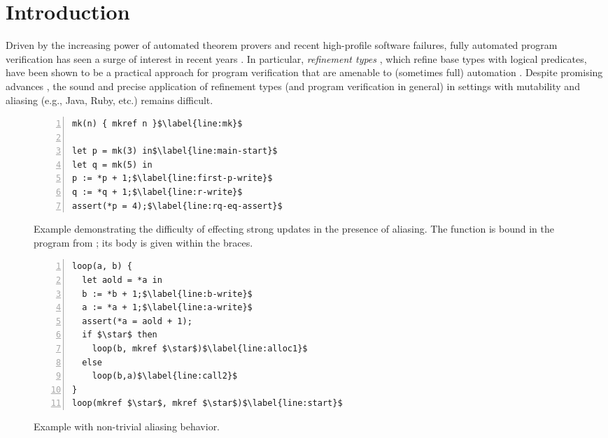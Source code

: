 \section{Introduction}
\label{sec:intro}
Driven by the increasing power of automated theorem provers and
recent high-profile software failures,
fully automated program verification has seen a surge of interest
in recent years \cite{leino2010dafny,cousot2005astree,ball2011decade,zave2012using,hawblitzel2015ironfleet,bhargavan2017everest}.
In particular, \emph{refinement types}
\cite{flanagan2006hybrid,xi1999dependent,freeman1991refinement,bengtson2011refinement},
which refine base types with logical predicates, have been shown to be a practical
approach for program verification that are amenable to
(sometimes full) automation \cite{rondon2008liquid,vazou2014refinement,vazou2013abstract,unno2009dependent}.
Despite promising advances \cite{rondon2010low,kahsai2017quantified,gordon2013rely},
the sound and precise application of refinement types (and program
verification in general) in settings with mutability and aliasing
(e.g., Java, Ruby, etc.) remains difficult.


\begin{figure}[t]
  \begin{minipage}[t]{0.45\textwidth}
  \begin{lstlisting}[numbers=left, numbersep=3pt, numberstyle=\tiny\color{black},numberblanklines=false]
mk(n) { mkref n }$\label{line:mk}$

let p = mk(3) in$\label{line:main-start}$
let q = mk(5) in
p := *p + 1;$\label{line:first-p-write}$
q := *q + 1;$\label{line:r-write}$
assert(*p = 4);$\label{line:rq-eq-assert}$
  \end{lstlisting}
  \caption{Example demonstrating the difficulty of effecting strong updates in the presence of aliasing. The function  is
    bound in the program from ; its body is given within the braces.}
  \label{fig:strong-update-example}
\end{minipage}
\hfill
\begin{minipage}[t]{0.45\textwidth}
  \begin{lstlisting}[numbers=left, numbersep=3pt, numberstyle=\tiny\color{black},numberblanklines=false]
loop(a, b) {
  let aold = *a in
  b := *b + 1;$\label{line:b-write}$
  a := *a + 1;$\label{line:a-write}$
  assert(*a = aold + 1);
  if $\star$ then
    loop(b, mkref $\star$)$\label{line:alloc1}$
  else
    loop(b,a)$\label{line:call2}$
}
loop(mkref $\star$, mkref $\star$)$\label{line:start}$
\end{lstlisting}
  \caption{Example with non-trivial aliasing behavior.}
  \label{fig:hard-loop}
\end{minipage}
\end{figure}

